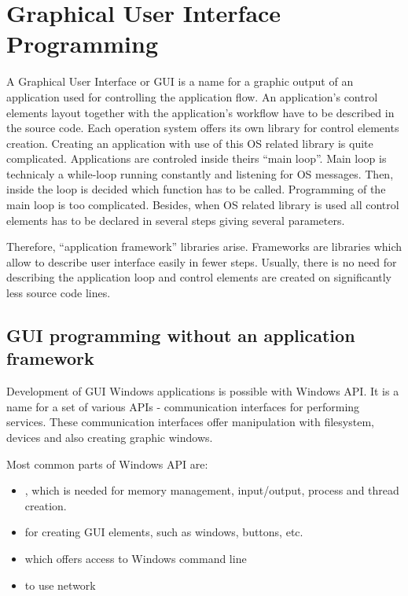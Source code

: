 \chapter{Graphical User Interface Programming}
\vspace{-10mm}

A Graphical User Interface or GUI is a name for a graphic output of an application used for controlling the application flow. An application's control elements layout together with the application's workflow have to be described in the source code. Each operation system offers its own library for control elements creation. Creating an application with use of this OS related library is quite complicated. Applications are controled inside theirs ``main loop''. Main loop is technicaly a while-loop running constantly and listening for OS messages. Then, inside the loop is decided which function has to be called. Programming of the main loop is too complicated. Besides, when OS related library is used all control elements has to be declared in several steps giving several parameters.

Therefore, ``application framework'' libraries arise. Frameworks are libraries which allow to describe user interface easily in fewer steps. Usually, there is no need for describing the application loop and control elements are created on significantly less source code lines.


\section{GUI programming without an application framework}
\label{noqt}

Development of GUI Windows applications is possible with Windows API. It is a name for a set of various APIs - communication interfaces for performing services. These communication interfaces offer manipulation with filesystem, devices and also creating graphic windows.

Most common parts of Windows API are:
\begin{itemize}
\item {}, which is needed for memory management, input/output, process and thread creation.
\item {} for creating GUI elements, such as windows, buttons, etc.
\item {} which offers access to Windows command line
\item {} to use network
\end{itemize}

